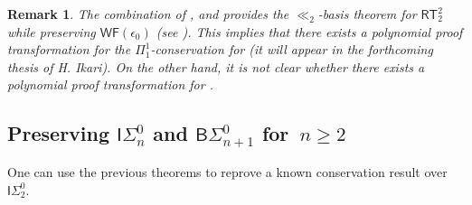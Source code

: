 \documentclass{article}
\numberwithin{theorem}{section}
\newtheorem{remark}[theorem]{Remark}
\newcommand{\ludovic}[1]{\textcolor{blue}{#1}}
\newcommand{\quentin}[1]{\textcolor{green}{#1}}
\newcommand{\RCA}{\mathsf{RCA}}
\newcommand{\BSig}{\mathsf{B}\Sigma^0}
\newcommand{\ISig}{\mathsf{I}\Sigma^0}
\newcommand{\WF}{\mathsf{WF}}
\newcommand{\RT}{\mathsf{RT}}
\newcommand{\TT}{\mathsf{TT}}
\newcommand{\M}{\mathcal{M}}
\begin{document}
    

\begin{remark}
The combination of ,  and   provides the $\ll_2$-basis theorem for $\RT^2_2$ while preserving $\WF(\epsilon_0)$ (see \cite[Definition 4.9]{fiori2021isomorphism}).
This implies that there exists a polynomial proof transformation for the $\Pi^1_1$-conservation for  (it will appear in the forthcoming thesis of H. Ikari).
On the other hand, it is not clear whether there exists a polynomial proof transformation for .
\end{remark}

\subsection{Preserving $\ISig_n$ and $\BSig_{n+1}$ for~$n \geq 2$}

One can use the previous theorems to reprove a known conservation result over~$\ISig_2$.
\end{document}
